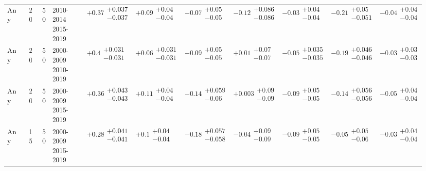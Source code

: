 \begin{table}[H]
\begin{tabular}{lrrllllllll}
Any & 20 & 50 & \makecell{2010-2014 \\ 2015-2019} & $\bm{+0.37}\substack{+0.037 \\ -0.037}$ & $\bm{+0.09}\substack{+0.04 \\ -0.04}$ & $\bm{-0.07}\substack{+0.05 \\ -0.05}$ & $\bm{-0.12}\substack{+0.086 \\ -0.086}$ & $-0.03\substack{+0.04 \\ -0.04}$ & $\bm{-0.21}\substack{+0.05 \\ -0.051}$ & $-0.04\substack{+0.04 \\ -0.04}$ \\
Any & 20 & 50 & \makecell{2000-2009 \\ 2010-2019} & $\bm{+0.4}\substack{+0.031 \\ -0.031}$ & $\bm{+0.06}\substack{+0.031 \\ -0.031}$ & $\bm{-0.09}\substack{+0.05 \\ -0.05}$ & $+0.01\substack{+0.07 \\ -0.07}$ & $\bm{-0.05}\substack{+0.035 \\ -0.035}$ & $\bm{-0.19}\substack{+0.046 \\ -0.046}$ & $\bm{-0.03}\substack{+0.03 \\ -0.03}$ \\
Any & 20 & 50 & \makecell{2000-2009 \\ 2015-2019} & $\bm{+0.36}\substack{+0.043 \\ -0.043}$ & $\bm{+0.11}\substack{+0.04 \\ -0.04}$ & $\bm{-0.14}\substack{+0.059 \\ -0.06}$ & $+0.003\substack{+0.09 \\ -0.09}$ & $\bm{-0.09}\substack{+0.05 \\ -0.05}$ & $\bm{-0.14}\substack{+0.056 \\ -0.056}$ & $\bm{-0.05}\substack{+0.04 \\ -0.04}$ \\
Any & 15 & 50 & \makecell{2000-2009 \\ 2015-2019} & $\bm{+0.28}\substack{+0.041 \\ -0.041}$ & $\bm{+0.1}\substack{+0.04 \\ -0.04}$ & $\bm{-0.18}\substack{+0.057 \\ -0.058}$ & $-0.04\substack{+0.09 \\ -0.09}$ & $\bm{-0.09}\substack{+0.05 \\ -0.05}$ & $-0.05\substack{+0.05 \\ -0.06}$ & $-0.03\substack{+0.04 \\ -0.04}$ \\

\end{tabular}
\end{table}
